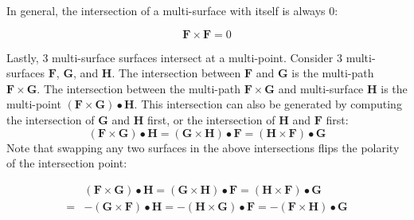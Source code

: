 
In general, the intersection of a multi-surface with itself is always \(0\):

\begin{thm}
\[\mathbf{F} \times \mathbf{F} = 0\]
\end{thm}


Lastly, 3 multi-surface surfaces intersect at a multi-point. Consider \(3\) multi-surfaces \(\mathbf{F}\), \(\mathbf{G}\), and \(\mathbf{H}\). The intersection between \(\mathbf{F}\) and \(\mathbf{G}\) is the multi-path \(\mathbf{F} \times \mathbf{G}\). The intersection between the multi-path \(\mathbf{F} \times \mathbf{G}\) and multi-surface \(\mathbf{H}\) is the multi-point \((\mathbf{F} \times \mathbf{G}) \bullet \mathbf{H}\). This intersection can also be generated by computing the intersection of \(\mathbf{G}\) and \(\mathbf{H}\) first, or the intersection of \(\mathbf{H}\) and \(\mathbf{F}\) first:
\[(\mathbf{F} \times \mathbf{G}) \bullet \mathbf{H} = (\mathbf{G} \times \mathbf{H}) \bullet \mathbf{F} = (\mathbf{H} \times \mathbf{F}) \bullet \mathbf{G}\]
Note that swapping any two surfaces in the above intersections flips the polarity of the intersection point:
\begin{thm}
\begin{align*}
& (\mathbf{F} \times \mathbf{G}) \bullet \mathbf{H} = (\mathbf{G} \times \mathbf{H}) \bullet \mathbf{F} = (\mathbf{H} \times \mathbf{F}) \bullet \mathbf{G} \\ 
= & -(\mathbf{G} \times \mathbf{F}) \bullet \mathbf{H} = -(\mathbf{H} \times \mathbf{G}) \bullet \mathbf{F} = -(\mathbf{F} \times \mathbf{H}) \bullet \mathbf{G}
\end{align*}
\end{thm}

